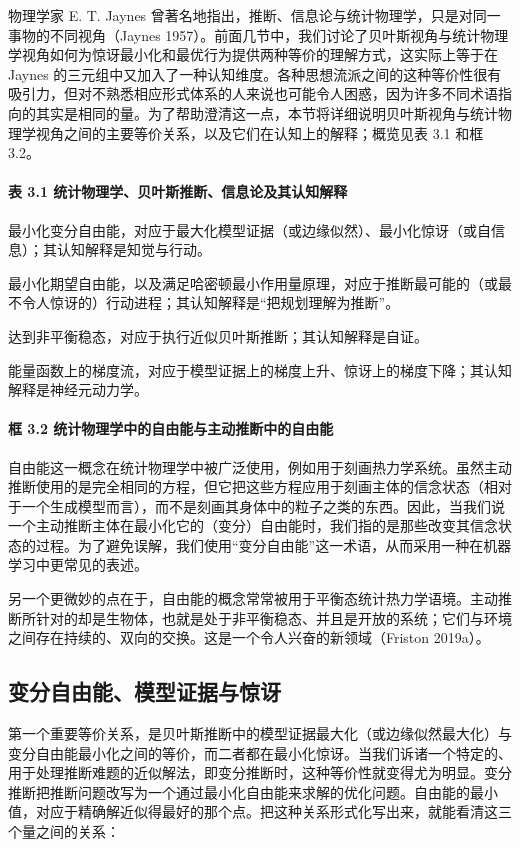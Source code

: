 物理学家 E. T. Jaynes 曾著名地指出，推断、信息论与统计物理学，只是对同一事物的不同视角（Jaynes 1957）。前面几节中，我们讨论了贝叶斯视角与统计物理学视角如何为惊讶最小化和最优行为提供两种等价的理解方式，这实际上等于在 Jaynes 的三元组中又加入了一种认知维度。各种思想流派之间的这种等价性很有吸引力，但对不熟悉相应形式体系的人来说也可能令人困惑，因为许多不同术语指向的其实是相同的量。为了帮助澄清这一点，本节将详细说明贝叶斯视角与统计物理学视角之间的主要等价关系，以及它们在认知上的解释；概览见表 3.1 和框 3.2。

\paragraph{表 3.1 统计物理学、贝叶斯推断、信息论及其认知解释}
最小化变分自由能，对应于最大化模型证据（或边缘似然）、最小化惊讶（或自信息）；其认知解释是知觉与行动。

最小化期望自由能，以及满足哈密顿最小作用量原理，对应于推断最可能的（或最不令人惊讶的）行动进程；其认知解释是“把规划理解为推断”。

达到非平衡稳态，对应于执行近似贝叶斯推断；其认知解释是自证。

能量函数上的梯度流，对应于模型证据上的梯度上升、惊讶上的梯度下降；其认知解释是神经元动力学。

\paragraph{框 3.2 统计物理学中的自由能与主动推断中的自由能}
自由能这一概念在统计物理学中被广泛使用，例如用于刻画热力学系统。虽然主动推断使用的是完全相同的方程，但它把这些方程应用于刻画主体的信念状态（相对于一个生成模型而言），而不是刻画其身体中的粒子之类的东西。因此，当我们说一个主动推断主体在最小化它的（变分）自由能时，我们指的是那些改变其信念状态的过程。为了避免误解，我们使用“变分自由能”这一术语，从而采用一种在机器学习中更常见的表述。

另一个更微妙的点在于，自由能的概念常常被用于平衡态统计热力学语境。主动推断所针对的却是生物体，也就是处于非平衡稳态、并且是开放的系统；它们与环境之间存在持续的、双向的交换。这是一个令人兴奋的新领域（Friston 2019a）。

\subsection{变分自由能、模型证据与惊讶}

第一个重要等价关系，是贝叶斯推断中的模型证据最大化（或边缘似然最大化）与变分自由能最小化之间的等价，而二者都在最小化惊讶。当我们诉诸一个特定的、用于处理推断难题的近似解法，即变分推断时，这种等价性就变得尤为明显。变分推断把推断问题改写为一个通过最小化自由能来求解的优化问题。自由能的最小值，对应于精确解近似得最好的那个点。把这种关系形式化写出来，就能看清这三个量之间的关系：

